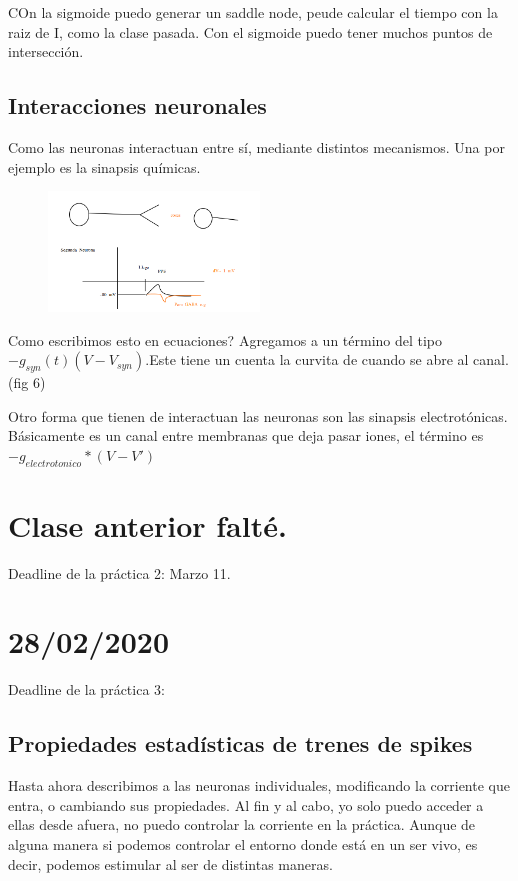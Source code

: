 COn la sigmoide puedo generar un saddle node, peude calcular el tiempo con la raiz de I, como la clase pasada. Con el sigmoide puedo tener muchos puntos de intersección.


\subsection{Interacciones neuronales}

Como las neuronas interactuan entre sí, mediante distintos mecanismos. Una por ejemplo es  la sinapsis químicas. 

\begin{figure}[htbp]
	\centering
	\includegraphics[width=0.5\textwidth]{+6.png}
\end{figure}

Como escribimos esto en ecuaciones? Agregamos a un término del tipo $-g_{syn}(t)(V-V_{syn})$.Este tiene un cuenta la curvita de cuando se abre al canal. (fig 6)

Otro forma que tienen de interactuan las neuronas son las sinapsis electrotónicas. Básicamente es un canal entre membranas que deja pasar iones, el término es $-g_{electrotonico}*(V-V')$

\section{Clase anterior falté.}

Deadline de la práctica 2: Marzo 11.

\section{28/02/2020}

Deadline de la práctica 3:

\subsection{Propiedades estadísticas de trenes de spikes}

Hasta ahora describimos a las neuronas individuales, modificando la corriente que entra, o cambiando sus propiedades. Al fin y al cabo, yo solo puedo acceder a ellas desde afuera, no puedo controlar la corriente en la práctica. Aunque de alguna manera  si podemos controlar el entorno donde está en un ser vivo, es decir, podemos estimular al ser de distintas maneras.

